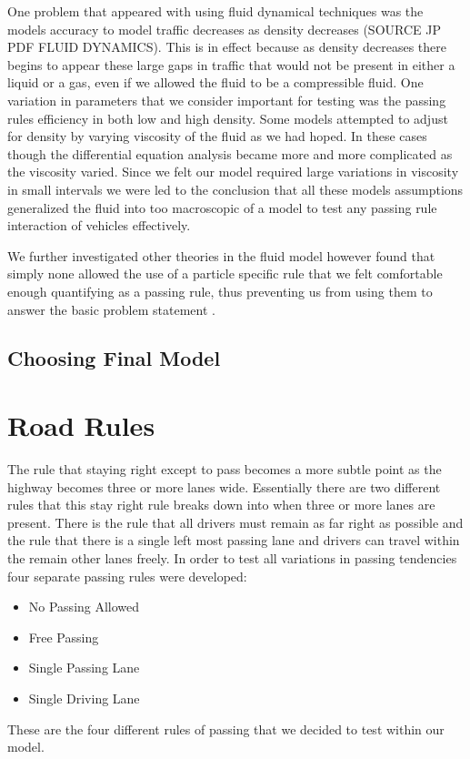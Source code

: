 \documentclass{amsart}
\begin{document}
	One problem that appeared with using fluid dynamical techniques was the models accuracy to model traffic decreases as density decreases (SOURCE JP PDF FLUID DYNAMICS).  This is in effect because as density decreases there begins to appear these large gaps in traffic that would not be present in either a liquid or a gas, even if we allowed the fluid to be a compressible fluid.  One variation in parameters that we consider important for testing was the passing rules efficiency in both low and high density. Some models attempted to adjust for density by varying viscosity of the fluid as we had hoped.  In these cases though the differential equation analysis became more and more complicated as the viscosity varied.  Since we felt our model required large variations in viscosity in small intervals we were led to the conclusion that all these models assumptions generalized the fluid into too macroscopic of a model to test any passing rule interaction of vehicles effectively.    

	We further investigated other theories in the fluid model however found that simply none allowed the use of a particle specific rule that we felt comfortable enough quantifying as a passing rule, thus preventing us from using them to answer the basic problem statement \cite{piccolireview}.
	
	\subsection{Choosing Final Model}

\section{\bfseries{Road Rules}}
	The rule that staying right except to pass becomes a more subtle point as the highway becomes three or more lanes wide.  Essentially there are two different rules that this stay right rule breaks down into when three or more lanes are present.  There is the rule that all drivers must remain as far right as possible and the rule that there is a single left most passing lane and drivers can travel within the remain other lanes freely.  In order to test all variations in passing tendencies four separate passing rules were developed:
		\begin{itemize}
			\item No Passing Allowed
			\item Free Passing
			\item Single Passing Lane
			\item Single Driving Lane
		\end{itemize}
	These are the four different rules of passing that we decided to test within our model.
\end{document}
